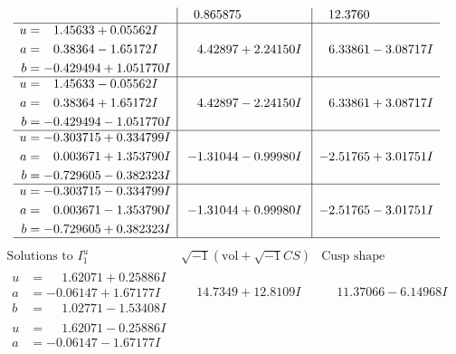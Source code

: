 \documentclass[1p]{elsarticle_modified}
\theoremstyle{definition}
\newcommand{\I}{\sqrt{-1}}
\begin{document}
$$\begin{array}{c|c|c}
 & \phantom{-}0.865875\phantom{ +0.000000I} & \phantom{-}12.3760\phantom{ +0.000000I} \\ \hline\begin{aligned}
u &= \phantom{-}1.45633 + 0.05562 I \\
a &= \phantom{-}0.38364 - 1.65172 I \\
b &= -0.429494 + 1.051770 I\end{aligned}
 & \phantom{-}4.42897 + 2.24150 I & \phantom{-}6.33861 - 3.08717 I \\ \hline\begin{aligned}
u &= \phantom{-}1.45633 - 0.05562 I \\
a &= \phantom{-}0.38364 + 1.65172 I \\
b &= -0.429494 - 1.051770 I\end{aligned}
 & \phantom{-}4.42897 - 2.24150 I & \phantom{-}6.33861 + 3.08717 I \\ \hline\begin{aligned}
u &= -0.303715 + 0.334799 I \\
a &= \phantom{-}0.003671 + 1.353790 I \\
b &= -0.729605 - 0.382323 I\end{aligned}
 & -1.31044 - 0.99980 I & -2.51765 + 3.01751 I \\ \hline\begin{aligned}
u &= -0.303715 - 0.334799 I \\
a &= \phantom{-}0.003671 - 1.353790 I \\
b &= -0.729605 + 0.382323 I\end{aligned}
 & -1.31044 + 0.99980 I & -2.51765 - 3.01751 I\\
 \hline 
 \end{array}$$\newpage$$\begin{array}{c|c|c}  
\text{Solutions to }I^u_{1}& \I (\text{vol} + \sqrt{-1}CS) & \text{Cusp shape}\\
 \hline 
\begin{aligned}
u &= \phantom{-}1.62071 + 0.25886 I \\
a &= -0.06147 + 1.67177 I \\
b &= \phantom{-}1.02771 - 1.53408 I\end{aligned}
 & \phantom{-}14.7349 + 12.8109 I & \phantom{-}11.37066 - 6.14968 I \\ \hline\begin{aligned}
u &= \phantom{-}1.62071 - 0.25886 I \\
a &= -0.06147 - 1.67177 I \\

\end{aligned}
\end{array}$$
\end{document}
